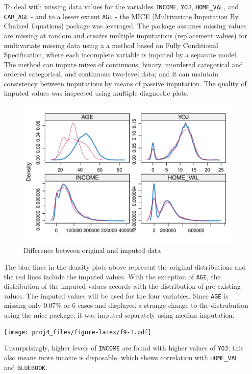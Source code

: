 \documentclass[]{article}
\begin{document}
To deal with missing data values for the variables \texttt{INCOME},
\texttt{YOJ}, \texttt{HOME\_VAL}, and \texttt{CAR\_AGE} - and to a
lesser extent \texttt{AGE} - the MICE (Multivariate Imputation By
Chained Equations) package was leveraged. The package assumes missing
values are missing at random and creates multiple imputations
(replacement values) for multivariate missing data using a a method
based on Fully Conditional Specification, where each incomplete variable
is imputed by a separate model. The method can impute mixes of
continuous, binary, unordered categorical and ordered categorical, and
continuous two-level data; and it can maintain consistency between
imputations by means of passive imputation. The quality of imputed
values was inspected using multiple diagnostic plots.

\begin{figure}
\centering
\includegraphics{proj4_files/figure-latex/f8-1.pdf}
\caption{\label{fig:f8}Difference between original and imputed data}
\end{figure}

The blue lines in the density plots above represent the original
distributions and the red lines include the imputed values. With the
exception of \texttt{AGE}, the distribution of the imputed values
accords with the distribution of pre-existing values. The imputed values
will be used for the four variables. Since \texttt{AGE} is missing only
0.07\% or 6 cases and displayed a strange change to the distrubution
using the mice package, it was imputed separately using median
imputation.

\texttt{[image: proj4\_files/figure-latex/f9-1.pdf]}

Unsurprisingly, higher levels of \texttt{INCOME} are found with higher
values of \texttt{YOJ}; this also means more income is disposable, which
shows correlation with \texttt{HOME\_VAL} and \texttt{BLUEBOOK}.
\end{document}
